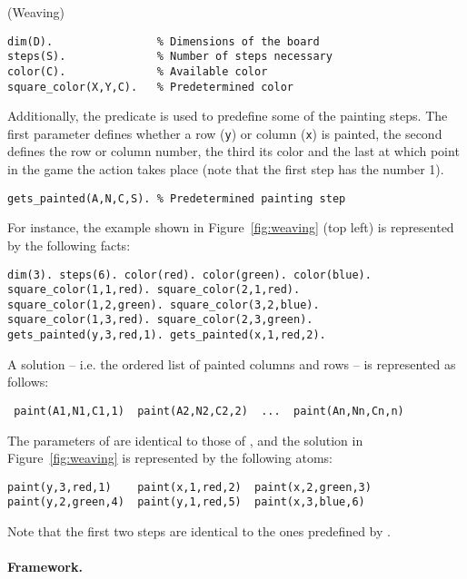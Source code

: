 \documentclass[a4paper,12pt]{article}
\begin{document}
\begin{PraktikumsAufgabe}{1}{(Weaving)}
\vspace{-1.5mm}
\begin{verbatim}
dim(D).                % Dimensions of the board
steps(S).              % Number of steps necessary
color(C).              % Available color
square_color(X,Y,C).   % Predetermined color
\end{verbatim}
\vspace{-1mm}
Additionally, the predicate  is used to predefine some of the painting steps.
The first parameter defines whether a row (\verb+y+) or column (\verb+x+) is painted,
the second defines the row or column number,
the third its color and the last at which point in the game the action takes place
(note that the first step has the number 1).
\begin{verbatim}
gets_painted(A,N,C,S). % Predetermined painting step
\end{verbatim}
\newpage
For instance, the example shown in Figure~\ref{fig:weaving} (top left) is
represented by the following facts:%
\vspace{-1.5mm}
\begin{verbatim}
dim(3). steps(6). color(red). color(green). color(blue).
square_color(1,1,red). square_color(2,1,red).
square_color(1,2,green). square_color(3,2,blue).
square_color(1,3,red). square_color(2,3,green).
gets_painted(y,3,red,1). gets_painted(x,1,red,2).
\end{verbatim}
\vspace{-1mm}
A solution -- i.e. the ordered list of painted columns and rows -- is represented as follows:
\vspace{-1.5mm}
\begin{verbatim}
 paint(A1,N1,C1,1)  paint(A2,N2,C2,2)  ...  paint(An,Nn,Cn,n)
\end{verbatim}
\vspace{-1mm}
The parameters of  are identical to those of , and
the solution in Figure~\ref{fig:weaving} is represented by the following atoms:
\vspace{-1.5mm}
\begin{verbatim}
paint(y,3,red,1)    paint(x,1,red,2)  paint(x,2,green,3)
paint(y,2,green,4)  paint(y,1,red,5)  paint(x,3,blue,6)
\end{verbatim}
\vspace{-1mm}
Note that the first two steps are identical to the ones predefined by .

\paragraph{Framework.}


\end{PraktikumsAufgabe}
\end{document}
